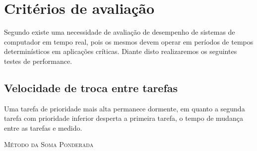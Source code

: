 
\section{Critérios de avaliação}
Segundo \cite{Garcia} existe uma necessidade de avaliação de desempenho de
sistemas de computador em tempo real, pois os mesmos devem operar em
períodos de tempos determinísticos em aplicações críticas. Diante disto
realizaremos os seguintes testes de performance.

\subsection{Velocidade de troca entre tarefas}
Uma tarefa de prioridade mais alta permanece dormente, em quanto a segunda tarefa
com prioridade inferior desperta a primeira tarefa, o tempo de mudança entre as
tarefas e medido.

\begin{algorithm}
	\SetAlgoLined
		\label{algo:soma-ponderada}
		\caption{\textsc{Método da Soma Ponderada}}
	\end{algorithm}


